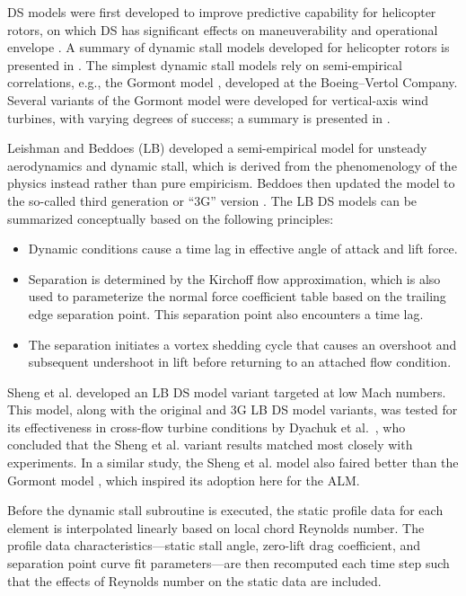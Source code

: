 \documentclass[times]{weauth}
\begin{document}
DS models were first developed to improve predictive capability for helicopter
rotors, on which DS has significant effects on maneuverability and operational
envelope \cite{Bousman2000}. A summary of dynamic stall models developed for
helicopter rotors is presented in \cite{Leishman2006}. The simplest dynamic
stall models rely on semi-empirical correlations, e.g., the Gormont model
\cite{Gormont1973}, developed at the Boeing--Vertol Company. Several variants of
the Gormont model were developed for vertical-axis wind turbines, with varying
degrees of success; a summary is presented in \cite{Para2002}.

Leishman and Beddoes (LB) \cite{Leishman1989} developed a semi-empirical model
for unsteady aerodynamics and dynamic stall, which is derived from the
phenomenology of the physics instead rather than pure empiricism. Beddoes then
updated the model to the so-called third generation or ``3G'' version
\cite{Beddoes1993}. The LB DS models can be summarized conceptually based on the
following principles:
\begin{itemize}
    \item Dynamic conditions cause a time lag in effective angle of attack and
    lift force.

    \item Separation is determined by the Kirchoff flow approximation, which is
    also used to parameterize the normal force coefficient table based on the
    trailing edge separation point. This separation point also encounters a time
    lag.

    \item The separation initiates a vortex shedding cycle that causes an
    overshoot and subsequent undershoot in lift before returning to an attached
    flow condition.
\end{itemize}

Sheng et al. \cite{Sheng2008} developed an LB DS model variant targeted at low
Mach numbers. This model, along with the original and 3G LB DS model variants,
was tested for its effectiveness in cross-flow turbine conditions by Dyachuk et
al.~\cite{Dyachuk2014}, who concluded that the Sheng et al. variant results
matched most closely with experiments. In a similar study, the Sheng et al.
model also faired better than the Gormont model \cite{Dyachuk2015}, which
inspired its adoption here for the ALM.

Before the dynamic stall subroutine is executed, the static profile data for
each element is interpolated linearly based on local chord Reynolds number. The
profile data characteristics---static stall angle, zero-lift drag coefficient,
and separation point curve fit parameters---are then recomputed each time step
such that the effects of Reynolds number on the static data are included.
\end{document}
